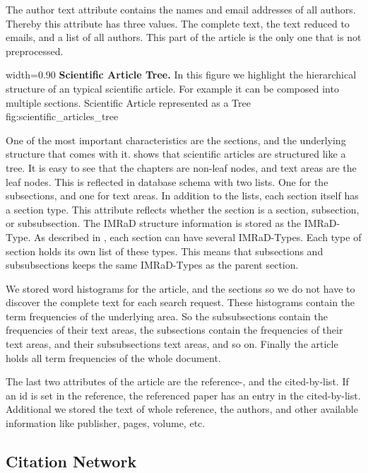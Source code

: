 The author text attribute contains the names and email addresses of all authors. Thereby this attribute has three values. The complete text, the text reduced to emails, and a list of all authors. This part of the article is the only one that is not preprocessed.

      {width=0.90\textwidth}
      {\textbf{Scientific Article Tree.} In this figure we highlight the hierarchical structure of an typical scientific article. For example it can be composed into multiple sections.}
      {Scientific Article represented as a Tree}
      {fig:scientific_articles_tree}

One of the most important characteristics are the sections, and the underlying structure that comes with it.  shows that scientific articles are structured like a tree. It is easy to see that the chapters are non-leaf nodes, and text areas are the leaf nodes. This is reflected in database schema with two lists. One for the subsections, and one for text areas. In addition to the lists, each section itself has a section type. This attribute reflects whether the section is a section, subsection, or subsubsection. The IMRaD structure information is stored as the IMRaD-Type. As described in , each section can have several IMRaD-Types. Each type of section holds its own list of these types. This means that subsections and subsubsections keeps the same IMRaD-Types as the parent section.

We stored word histograms for the article, and the sections so we do not have to discover the complete text for each search request. These histograms contain the term frequencies of the underlying area. So the subsubsections contain the frequencies of their text areas, the subsections contain the frequencies of their text areas, and their subsubsections text areas, and so on. Finally the article holds all term frequencies of the whole document.

The last two attributes of the article are the reference-, and the cited-by-list. If an id is set in the reference, the referenced paper has an entry in the cited-by-list. Additional we stored the text of whole reference, the authors, and other available information like publisher, pages, volume, etc.

\subsection{Citation Network}
\label{sec:citation_network}

